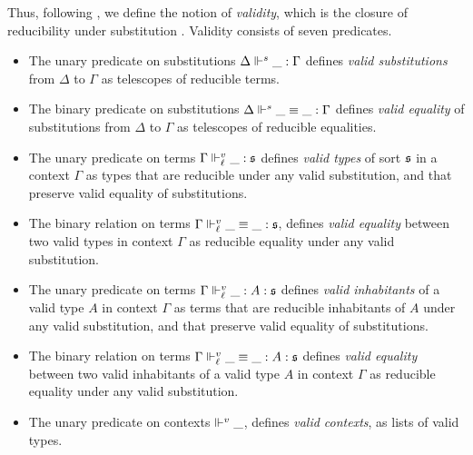 Thus, following , we define 
the notion of \emph{validity}, which is the closure of reducibility under substitution 
. 
% 
Validity consists of seven predicates.
\begin{itemize}
\item The unary predicate on substitutions \( \Delta \Vdash^s \_ : \Gamma \) 
defines \emph{valid substitutions} from \( \Delta \) to \( \Gamma \) as telescopes
of reducible terms. 
\item The binary predicate on substitutions \( \Delta \Vdash^s \_ \equiv \_ : \Gamma \) 
defines \emph{valid equality} of substitutions from \( \Delta \) to \( \Gamma \) as
telescopes of reducible equalities.
\item The unary predicate on terms \( \Gamma \Vdash^v_{\ell} \_ : \mathfrak{s} \) defines
\emph{valid types} of sort \( \mathfrak{s} \) in a context \( \Gamma \) as types that are 
reducible under any valid substitution, and that preserve valid equality of
substitutions.
\item The binary relation on terms \( \Gamma \Vdash^v_{\ell} \_ \equiv \_ : \mathfrak{s} \), 
defines \emph{valid equality} between two valid types in context \( \Gamma \) as
reducible equality under any valid substitution.
\item The unary predicate on terms \( \Gamma \Vdash^v_{\ell} \_ : A : \mathfrak{s} \) 
defines \emph{valid inhabitants} of a valid type \( A \) in context \( \Gamma \) as
terms that are reducible inhabitants of \( A \) under any valid substitution,
and that preserve valid equality of substitutions.
\item The binary relation on terms \( \Gamma \Vdash^v_{\ell} \_ \equiv \_ : A : \mathfrak{s} \) 
defines \emph{valid equality} between two valid inhabitants of a valid type \( A \) in 
context \( \Gamma \) as reducible equality under any valid substitution.
\item The unary predicate on contexts \( {\Vdash^v \_} \), defines \emph{valid contexts},
as lists of valid types.
\end{itemize}

